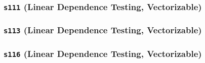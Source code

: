 \documentclass[acmsmall,review, nonacm]{acmart}
\begin{document}
\subsubsection{\texttt{s111} (Linear Dependence Testing, Vectorizable)}

\subsubsection{\texttt{s113} (Linear Dependence Testing, Vectorizable)}

\subsubsection{\texttt{s116} (Linear Dependence Testing, Vectorizable)}





% 



\end{document}

